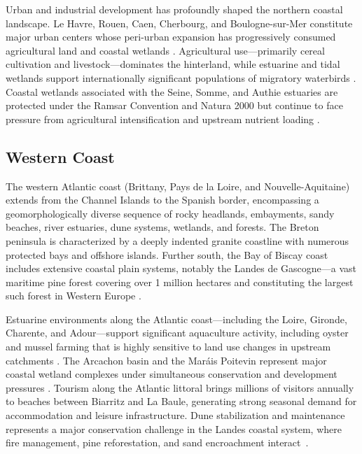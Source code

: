 \documentclass[coasts,article,accept,pdftex,moreauthors]{Definitions/mdpi}
\begin{document}
Urban and industrial development has profoundly shaped the northern coastal landscape. Le Havre, Rouen, Caen, Cherbourg, and Boulogne-sur-Mer constitute major urban centers whose peri-urban expansion has progressively consumed agricultural land and coastal wetlands \citep{dauvin2011estuaire}. Agricultural use—primarily cereal cultivation and livestock—dominates the hinterland, while estuarine and tidal wetlands support internationally significant populations of migratory waterbirds \citep{femenias2011estuaire}. Coastal wetlands associated with the Seine, Somme, and Authie estuaries are protected under the Ramsar Convention and Natura 2000 but continue to face pressure from agricultural intensification and upstream nutrient loading \citep{billen2007piren}.

\subsection{Western Coast}

The western Atlantic coast (Brittany, Pays de la Loire, and Nouvelle-Aquitaine) extends from the Channel Islands to the Spanish border, encompassing a geomorphologically diverse sequence of rocky headlands, embayments, sandy beaches, {river estuaries}, dune systems, wetlands, and forests. The Breton peninsula is characterized by a deeply indented granite coastline with numerous protected bays and offshore islands. Further south, the Bay of Biscay coast includes extensive coastal plain systems, notably the Landes de Gascogne—a vast maritime pine forest covering over 1 million hectares and constituting the largest such forest in Western Europe \citep{augustin2008landes}.

Estuarine environments along the Atlantic coast—including the Loire, Gironde, Charente, and Adour—support significant aquaculture activity, including oyster and mussel farming that is highly sensitive to land use changes in upstream catchments \citep{gueral2008conchyliculture}. The Arcachon basin and the Mar\'ais Poitevin represent major coastal wetland complexes under simultaneous conservation and development pressures \citep{verger2009marais}. Tourism along the Atlantic littoral brings millions of visitors annually to beaches between Biarritz and La Baule, generating strong seasonal demand for accommodation and leisure infrastructure. Dune stabilization and maintenance represents a major conservation challenge in the Landes coastal system, where fire management, pine reforestation, and sand encroachment interact~\citep{maugis2011dunes}.
\end{document}
